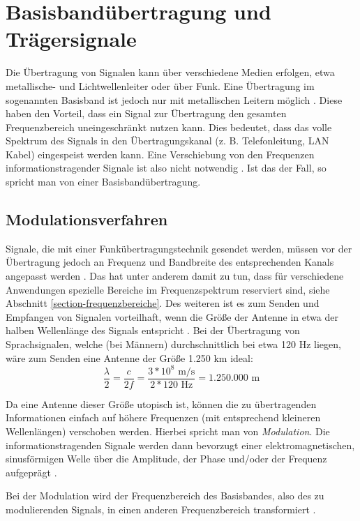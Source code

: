 \section{Basisbandübertragung und Trägersignale}
Die Übertragung von Signalen kann über verschiedene Medien erfolgen, etwa metallische- und Lichtwellenleiter oder über Funk. Eine Übertragung im sogenannten Basisband ist jedoch nur mit metallischen Leitern möglich \cite[vgl. Read, S. 149]{Read:2004}. Diese haben den Vorteil, dass ein Signal zur Übertragung den gesamten Frequenzbereich uneingeschränkt nutzen kann. Dies bedeutet, dass das volle Spektrum des Signals in den Übertragungskanal (z. B. Telefonleitung, LAN Kabel) eingespeist werden kann. Eine Verschiebung von den Frequenzen informationstragender Signale ist also nicht notwendig \cite[vgl. Werner, S. 158]{Werner:2006}. Ist das der Fall, so spricht man von einer Basisbandübertragung.\newline


\subsection{Modulationsverfahren}
Signale, die mit einer Funkübertragungstechnik gesendet werden, müssen vor der Übertragung jedoch an Frequenz und Bandbreite des entsprechenden Kanals angepasst werden \cite[vgl. Read, S. 24]{Read:2004}. 
Das hat unter anderem damit zu tun, dass für verschiedene Anwendungen spezielle Bereiche im Frequenzspektrum reserviert sind, siehe Abschnitt \ref{section-frequenzbereiche}.
Des weiteren ist es zum Senden und Empfangen von Signalen vorteilhaft, wenn die Größe der Antenne in etwa der halben Wellenlänge des Signals entspricht \cite[vgl. Kark, S. 4]{Kark:2017}.
Bei der Übertragung von Sprachsignalen, welche (bei Männern) durchschnittlich bei etwa 120 Hz liegen, wäre zum Senden eine Antenne der Größe 1.250 km ideal:
\[ \frac{\lambda}{2} = \frac{c}{2f} = \frac{3*10^8 \text{ m/s}}{2*120 \text{ Hz}} = 1.250.000 \text{ m}\]

Da eine Antenne dieser Größe utopisch ist, können die zu übertragenden Informationen einfach auf höhere Frequenzen (mit entsprechend kleineren Wellenlängen) verschoben werden. Hierbei spricht man von \textit{Modulation}.
Die informationstragenden Signale werden dann bevorzugt einer elektromagnetischen, sinusförmigen Welle über die Amplitude, der Phase und/oder der Frequenz aufgeprägt \cite[vgl. Werner, S. 242f]{Werner:2017}. %

Bei der Modulation wird der Frequenzbereich des Basisbandes, also des zu modulierenden Signals, in einen anderen Frequenzbereich transformiert \cite[vgl. Plaßmann, S. 1204]{Plassmann:2016}.

